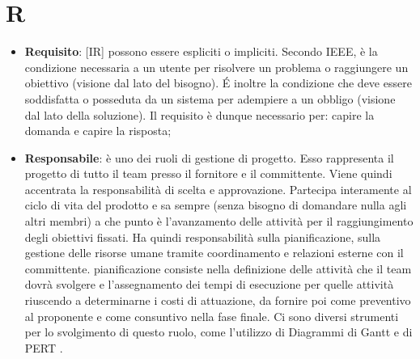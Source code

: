 %
%
%

\section{R}

\begin{itemize}
	\item \textbf{Requisito}: [IR] possono essere espliciti o impliciti. Secondo IEEE, è la condizione necessaria a un utente per risolvere un problema o raggiungere un obiettivo (visione dal lato del bisogno). \'E inoltre la condizione che deve essere soddisfatta o posseduta da un sistema per adempiere a un obbligo (visione dal lato della soluzione). \newline
	Il requisito è dunque necessario per: capire la domanda e capire la risposta;

	\item \textbf{Responsabile}: è uno dei ruoli di gestione di progetto. Esso rappresenta il progetto di tutto il team presso il fornitore e il committente. Viene quindi accentrata la responsabilità di scelta e approvazione. \newline
	Partecipa interamente al ciclo di vita del prodotto e sa sempre (senza bisogno di domandare nulla agli altri membri) a che punto è l'avanzamento delle attività per il raggiungimento degli obiettivi fissati. \newline
	Ha quindi responsabilità sulla pianificazione, sulla gestione delle risorse umane tramite coordinamento e relazioni esterne con il committente. \newline
 	pianificazione consiste nella definizione delle attività che il team dovrà svolgere e l'assegnamento dei tempi di esecuzione per quelle attività riuscendo a determinarne i costi di attuazione, da fornire poi come preventivo al proponente e come consuntivo nella fase finale. \newline
	Ci sono diversi strumenti per lo svolgimento di questo ruolo, come l'utilizzo di Diagrammi di Gantt e di PERT .


\end{itemize}
